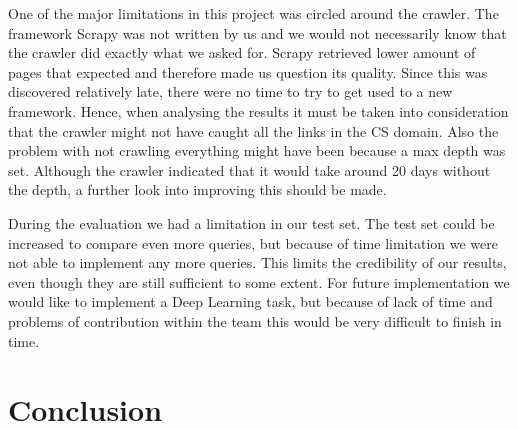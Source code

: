 One of the major limitations in this project was circled around the crawler. The framework Scrapy was not written by us and we would not necessarily know that the crawler did exactly what we asked for. Scrapy retrieved lower amount of pages that expected and therefore made us question its quality. Since this was discovered relatively late, there were no time to try to get used to a new framework. Hence, when analysing the results it must be taken into consideration that the crawler might not have caught all the links in the CS domain. Also the problem with not crawling everything might have been because a max depth was set. Although the crawler indicated that it would take around 20 days without the depth, a further look into improving this should be made.

During the evaluation we had a limitation in our test set. The test set could be increased to compare even more queries, but because of time limitation we were not able to implement any more queries. This limits the credibility of our results, even though they are still sufficient to some extent. For future implementation we would like to implement a Deep Learning task, but because of lack of time and problems of contribution within the team this would be very difficult to finish in time. 


\section{Conclusion} %
\label{sec:conclusion}




